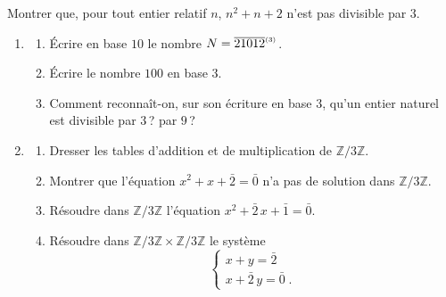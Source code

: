 \begin{exo}\label{exo:arith-24}
	Montrer que, pour tout entier relatif $n$, $n^2 + n + 2$ n'est pas divisible par $3$.
\end{exo}
%
\begin{exo}\label{exo:arith-25}
      \begin{enumerate}
            \item \begin{enumerate}
                        \item \'Ecrire en base $10$ le nombre $N = \overline{21012}^{_{(3)}}$.
                        \item \'Ecrire le nombre $100$ en base $3$.
                        \item Comment reconna\^it-on, sur son \'ecriture en base $3$, qu'un entier naturel est divisible par $3$\,?
                              par $9$\,?
                  \end{enumerate}
            \item \begin{enumerate}
                        \item Dresser les tables d'addition et de multiplication de $\mathbb{Z}/3\mathbb{Z}$.
                        \item Montrer que l'\'equation $x^2 + x + \bar{2} = \bar{0}$ n'a pas de solution dans $\mathbb{Z}/3\mathbb{Z}$.
                        \item R\'esoudre dans $\mathbb{Z}/3\mathbb{Z}$ l'\'equation $x^2 + \bar{2}\,x + \bar{1} = \bar{0}$.
                        \item R\'esoudre dans $\mathbb{Z}/3\mathbb{Z} \times \mathbb{Z}/3\mathbb{Z}$ le syst\`eme
                              \[
                                    \left\lbrace
                                          \begin{array}{l}
                                                x + y = \bar{2} \\
                                                x + \bar{2}\, y = \bar{0} \;.
                                          \end{array}
                                    \right.
                              \]
                  \end{enumerate}
      \end{enumerate}
\end{exo}
%
